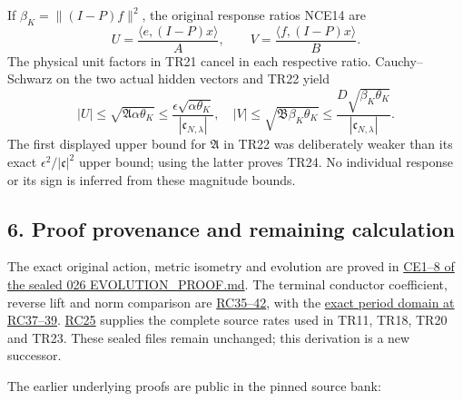 \documentclass[10pt]{article}
\begin{document}
If \(\beta_K=\|(I-P)f\|^2\), the original response ratios NCE14 are \[
U=\frac{\langle e,(I-P)x\rangle}{A},\qquad
V=\frac{\langle f,(I-P)x\rangle}{B}.
\] The physical unit factors in TR21 cancel in each respective ratio. Cauchy--Schwarz on the two actual hidden vectors and TR22 yield \[
\boxed{|U|\le\sqrt{\mathfrak A\alpha\theta_K}
\le\frac{\epsilon\sqrt{\alpha\theta_K}}{|\mathfrak c_{N,\lambda}|},
\quad
|V|\le\sqrt{\mathfrak B\beta_K\theta_K}
\le\frac{D\sqrt{\beta_K\theta_K}}{|\mathfrak c_{N,\lambda}|}.}
\tag{TR24}
\] The first displayed upper bound for \(\mathfrak A\) in TR22 was deliberately weaker than its exact \(\epsilon^2/|\mathfrak c|^2\) upper bound; using the latter proves TR24. No individual response or its sign is inferred from these magnitude bounds.

\subsection{6. Proof provenance and remaining calculation}\label{proof-provenance-and-remaining-calculation}

The exact original action, metric isometry and evolution are proved in \href{https://github.com/KokunoYumeto/zeta-function-research-reader/blob/5c69161ca70ee187f41df0bfe786e8b6eebed422/workbenches/splitzero-tandem/continuations/20260922-current-effective-cutoff/EVOLUTION_PROOF.md\#L18}{CE1--8 of the sealed 026 EVOLUTION\_PROOF.md}. The terminal conductor coefficient, reverse lift and norm comparison are \href{https://github.com/KokunoYumeto/zeta-function-research-reader/blob/5c69161ca70ee187f41df0bfe786e8b6eebed422/workbenches/splitzero-tandem/continuations/20260922-current-effective-cutoff/CUTOFF_CURRENT_CONNECTION.md\#L315}{RC35--42}, with the \href{https://github.com/KokunoYumeto/zeta-function-research-reader/blob/5c69161ca70ee187f41df0bfe786e8b6eebed422/workbenches/splitzero-tandem/continuations/20260922-current-effective-cutoff/CUTOFF_CURRENT_CONNECTION.md\#L332}{exact period domain at RC37--39}. \href{https://github.com/KokunoYumeto/zeta-function-research-reader/blob/5c69161ca70ee187f41df0bfe786e8b6eebed422/workbenches/splitzero-tandem/continuations/20260922-current-effective-cutoff/CUTOFF_CURRENT_CONNECTION.md\#L222}{RC25} supplies the complete source rates used in TR11, TR18, TR20 and TR23. These sealed files remain unchanged; this derivation is a new successor.

The earlier underlying proofs are public in the pinned source bank:
\end{document}
